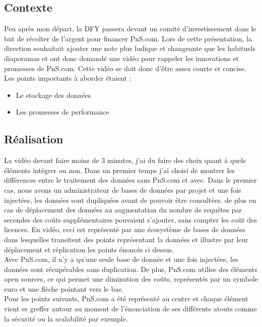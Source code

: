 \subsection{Contexte}
Peu après mon départ, la DFY passera devant un comité d'investissement dans le but de récolter de l'argent pour financer PnS.com. Lors de cette présentation, la direction souhaitait ajouter une note plus ludique et changeante que les habituels diaporamas et ont donc demandé une vidéo pour rappeler les innovations et promesses de PnS.com. Cette vidéo se doit donc d'être assez courte et concise. Les points importants à aborder étaient : 
\begin{itemize}
\item Le stockage des données
\item Les promesses de performance
\end{itemize}




\subsection{Réalisation}
La vidéo devant faire moins de 3 minutes, j'ai du faire des choix quant à quels éléments intégrer ou non. Dans un premier temps j'ai choisi de montrer les différences entre le traitement des données sans PnS.com et avec. Dans le premier cas, nous avons un administrateur de bases de données par projet et une fois injectées, les données sont dupliquées avant de pouvoir être consultées. de plus en cas de déplacement des données au augmentation du nombre de requêtes par secondes des coûts supplémentaires pouvaient s'ajouter, sans compter les coût des licences. En vidéo, ceci est représenté par une écosystème de bases de données dans lesquelles transitent des points représentant la données et illustre par leur déplacement et réplication les points énoncés ci dessus.\\

Avec PnS.com, il n'y a qu'une seule base de donnée et une fois injectées, les données sont récupérables sans duplication. De plus, PnS.com utilise des éléments open sources, ce qui permet une diminution des coûts, représentés par un symbole euro et une flèche pointant vers le bas.\\

Pour les points suivants, PnS.com a été représenté au centre et chaque élément vient se greffer autour au moment de l'énonciation de ses différents atouts comme la sécurité ou la scalabilité par exemple.


